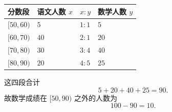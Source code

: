 \begin{answer}
\begin{center}
\begin{tabular}{llll}
\toprule
分数段 & 语文人数 $x$ & $x:y$ & 数学人数 $y$ \\
\midrule
$[50,60)$ & $5$ & $1:1$ & $5$ \\
$[60,70)$ & $40$ & $2:1$ & $20$ \\
$[70,80)$ & $30$ & $3:4$ & $40$ \\
$[80,90)$ & $20$ & $4:5$ & $25$ \\
\bottomrule
\end{tabular}
\end{center}

这四段合计
\nopagebreak[4]
\[5+20+40+25=90.\]
故数学成绩在 $[50,90)$ 之外的人数为
\nopagebreak[4]
\[100-90=10.\]



\gkanswer{答案（3）：$10$。语文各段人数为 $5,40,30,20$，按比例得数学各段人数 $5,20,40,25$，合计 $90$，故 $[50,90)$ 之外有 $100-90=10$ 人。}

\end{answer}
